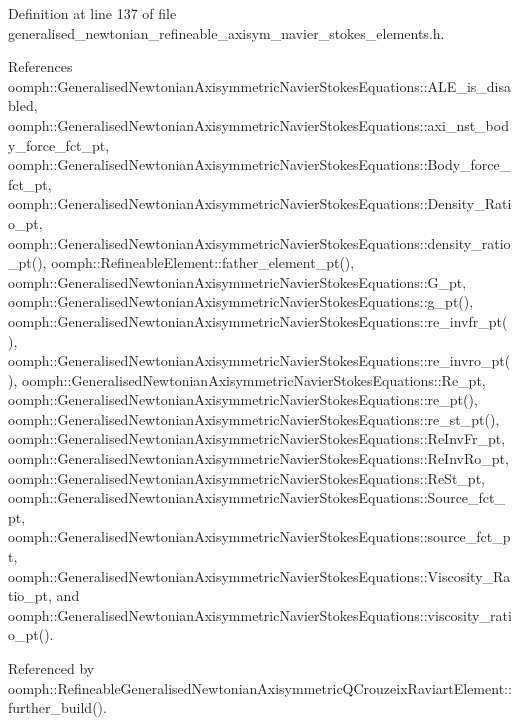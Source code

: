 Definition at line 137 of file generalised\+\_\+newtonian\+\_\+refineable\+\_\+axisym\+\_\+navier\+\_\+stokes\+\_\+elements.\+h.



References oomph\+::\+Generalised\+Newtonian\+Axisymmetric\+Navier\+Stokes\+Equations\+::\+A\+L\+E\+\_\+is\+\_\+disabled, oomph\+::\+Generalised\+Newtonian\+Axisymmetric\+Navier\+Stokes\+Equations\+::axi\+\_\+nst\+\_\+body\+\_\+force\+\_\+fct\+\_\+pt, oomph\+::\+Generalised\+Newtonian\+Axisymmetric\+Navier\+Stokes\+Equations\+::\+Body\+\_\+force\+\_\+fct\+\_\+pt, oomph\+::\+Generalised\+Newtonian\+Axisymmetric\+Navier\+Stokes\+Equations\+::\+Density\+\_\+\+Ratio\+\_\+pt, oomph\+::\+Generalised\+Newtonian\+Axisymmetric\+Navier\+Stokes\+Equations\+::density\+\_\+ratio\+\_\+pt(), oomph\+::\+Refineable\+Element\+::father\+\_\+element\+\_\+pt(), oomph\+::\+Generalised\+Newtonian\+Axisymmetric\+Navier\+Stokes\+Equations\+::\+G\+\_\+pt, oomph\+::\+Generalised\+Newtonian\+Axisymmetric\+Navier\+Stokes\+Equations\+::g\+\_\+pt(), oomph\+::\+Generalised\+Newtonian\+Axisymmetric\+Navier\+Stokes\+Equations\+::re\+\_\+invfr\+\_\+pt(), oomph\+::\+Generalised\+Newtonian\+Axisymmetric\+Navier\+Stokes\+Equations\+::re\+\_\+invro\+\_\+pt(), oomph\+::\+Generalised\+Newtonian\+Axisymmetric\+Navier\+Stokes\+Equations\+::\+Re\+\_\+pt, oomph\+::\+Generalised\+Newtonian\+Axisymmetric\+Navier\+Stokes\+Equations\+::re\+\_\+pt(), oomph\+::\+Generalised\+Newtonian\+Axisymmetric\+Navier\+Stokes\+Equations\+::re\+\_\+st\+\_\+pt(), oomph\+::\+Generalised\+Newtonian\+Axisymmetric\+Navier\+Stokes\+Equations\+::\+Re\+Inv\+Fr\+\_\+pt, oomph\+::\+Generalised\+Newtonian\+Axisymmetric\+Navier\+Stokes\+Equations\+::\+Re\+Inv\+Ro\+\_\+pt, oomph\+::\+Generalised\+Newtonian\+Axisymmetric\+Navier\+Stokes\+Equations\+::\+Re\+St\+\_\+pt, oomph\+::\+Generalised\+Newtonian\+Axisymmetric\+Navier\+Stokes\+Equations\+::\+Source\+\_\+fct\+\_\+pt, oomph\+::\+Generalised\+Newtonian\+Axisymmetric\+Navier\+Stokes\+Equations\+::source\+\_\+fct\+\_\+pt, oomph\+::\+Generalised\+Newtonian\+Axisymmetric\+Navier\+Stokes\+Equations\+::\+Viscosity\+\_\+\+Ratio\+\_\+pt, and oomph\+::\+Generalised\+Newtonian\+Axisymmetric\+Navier\+Stokes\+Equations\+::viscosity\+\_\+ratio\+\_\+pt().



Referenced by oomph\+::\+Refineable\+Generalised\+Newtonian\+Axisymmetric\+Q\+Crouzeix\+Raviart\+Element\+::further\+\_\+build().

\mbox{\label{classoomph_1_1RefineableGeneralisedNewtonianAxisymmetricNavierStokesEquations_a1079d819a74edb3a620dc01061168950}} 
